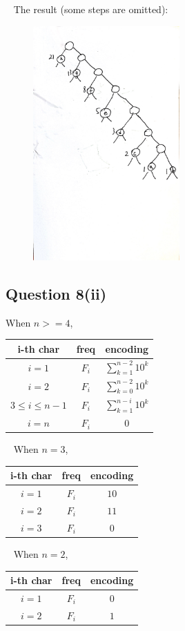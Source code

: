 \documentclass[11pt]{article}
\begin{document}
~\newline\noindent
The result (some steps are omitted):
\begin{figure}[hbt!]
  \centering
  \includegraphics[width=0.5\textwidth]{Huffman_code_result.jpg}
\end{figure}

\newpage
\subsection{Question 8(ii)}
When $n >= 4$, 
\begin{center}
\begin{tabular}{ c c c }
 i-th char & freq & encoding \\ 
 \hline
 $i = 1$ & $F_i$ & $\sum_{k=1}^{n-2} 10^k$ \\   
 $i = 2$ & $F_i$ & $\sum_{k=0}^{n-2} 10^k$ \\  
 $3 \leq i \leq n-1$ & $F_i$ & $\sum_{k=1}^{n-i} 10^k$ \\  
 $i = n$ & $F_i$ & $0$ \\  
\end{tabular}
\end{center}

~\newline\noindent
When $n = 3$, 
\begin{center}
\begin{tabular}{ c c c }
 i-th char & freq & encoding \\ 
 \hline
 $i = 1$ & $F_i$ & $10$ \\   
 $i = 2$ & $F_i$ & $11$ \\  
 $i = 3$ & $F_i$ & $0$ \\  
\end{tabular}
\end{center}

~\newline\noindent
When $n = 2$, 
\begin{center}
\begin{tabular}{ c c c }
 i-th char & freq & encoding \\ 
 \hline
 $i = 1$ & $F_i$ & $0$ \\   
 $i = 2$ & $F_i$ & $1$ \\   
\end{tabular}
\end{center}
\end{document}
